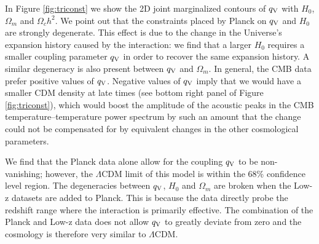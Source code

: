 \documentclass[a4paper,fleqn,usenatbib]{mnras}
\begin{document}
 In Figure \ref{fig:triconst} we show the 2D joint marginalized contours of $q_{\rm V}$ with $H_0$, $\Omega_m$ and $\Omega_c h^2$.
We point out that the constraints placed by Planck on $q_{\rm V}$ and $H_0$ are strongly degenerate. This effect is due to the change in the Universe's expansion history caused by the interaction: we find that a larger $H_0$ requires a smaller coupling parameter $q_{\rm V}$ in order to recover the same expansion history. A similar degeneracy is also present between $q_{\rm V}$ and $\Omega_m$. In general, the CMB data prefer positive values of $q_{\rm V}$. Negative values of $q_{\rm V}$ imply that we would have a smaller CDM density at late times (see bottom right panel of Figure \ref{fig:triconst}), which would boost the amplitude of the acoustic peaks in the CMB temperature--temperature power spectrum by such an amount that the change could not be compensated for by equivalent changes in the other cosmological parameters.

We find that the Planck data alone allow for the coupling $q_{\rm V}$ to be non-vanishing; however, the $\Lambda$CDM limit of this model is within the 68\% confidence level region. The degeneracies between $q_{\rm V}$, $H_0$ and $\Omega_m$ are broken when the Low-z datasets are added to Planck. This is because the data directly probe the redshift range where the interaction is primarily effective. The combination of the Planck and Low-z data does not allow $q_{\rm V}$ to greatly deviate  from zero and the cosmology is therefore very similar to $\Lambda$CDM.
\end{document}
